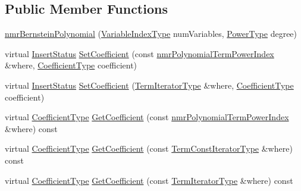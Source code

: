 \subsection*{Public Member Functions}
\begin{DoxyCompactItemize}
\item 
\hyperlink{classnmr_bernstein_polynomial_a7ef25e6984df6f2c6b4dbfc1ea2273cc}{nmr\-Bernstein\-Polynomial} (\hyperlink{classnmr_polynomial_base_aae95477e451ddc7d3ee3f41cbdaadde2}{Variable\-Index\-Type} num\-Variables, \hyperlink{classnmr_polynomial_base_a58607c884bf2e6725a77ed4d9e14ba26}{Power\-Type} degree)
\item 
virtual \hyperlink{classnmr_polynomial_base_ac3b6b28653104ea70419279a35580940}{Insert\-Status} \hyperlink{classnmr_bernstein_polynomial_ada942e63869c140436d7b9706b2b5199}{Set\-Coefficient} (const \hyperlink{classnmr_polynomial_term_power_index}{nmr\-Polynomial\-Term\-Power\-Index} \&where, \hyperlink{classnmr_polynomial_base_a8693efdfc8585ccb49abea69f74f3eef}{Coefficient\-Type} coefficient)
\item 
virtual \hyperlink{classnmr_polynomial_base_ac3b6b28653104ea70419279a35580940}{Insert\-Status} \hyperlink{classnmr_bernstein_polynomial_a39bb0e94db9696628401d9e6f5e74b1e}{Set\-Coefficient} (\hyperlink{classnmr_polynomial_container_a276e57445d038e8a16462f47b85719a3}{Term\-Iterator\-Type} \&where, \hyperlink{classnmr_polynomial_base_a8693efdfc8585ccb49abea69f74f3eef}{Coefficient\-Type} coefficient)
\item 
virtual \hyperlink{classnmr_polynomial_base_a8693efdfc8585ccb49abea69f74f3eef}{Coefficient\-Type} \hyperlink{classnmr_bernstein_polynomial_a658ac3ee28fcc0ee072a83c79eaf2489}{Get\-Coefficient} (const \hyperlink{classnmr_polynomial_term_power_index}{nmr\-Polynomial\-Term\-Power\-Index} \&where) const 
\item 
virtual \hyperlink{classnmr_polynomial_base_a8693efdfc8585ccb49abea69f74f3eef}{Coefficient\-Type} \hyperlink{classnmr_bernstein_polynomial_aff3c634b10989a7ac81272eb06e5f5a8}{Get\-Coefficient} (const \hyperlink{classnmr_polynomial_container_aba8d31506ab6a487fdc4fe2815469442}{Term\-Const\-Iterator\-Type} \&where) const 
\item 
virtual \hyperlink{classnmr_polynomial_base_a8693efdfc8585ccb49abea69f74f3eef}{Coefficient\-Type} \hyperlink{classnmr_bernstein_polynomial_a989595e97345a8dbfab7c77c637dc9fb}{Get\-Coefficient} (const \hyperlink{classnmr_polynomial_container_a276e57445d038e8a16462f47b85719a3}{Term\-Iterator\-Type} \&where) const 
\item 

\end{DoxyCompactItemize}
